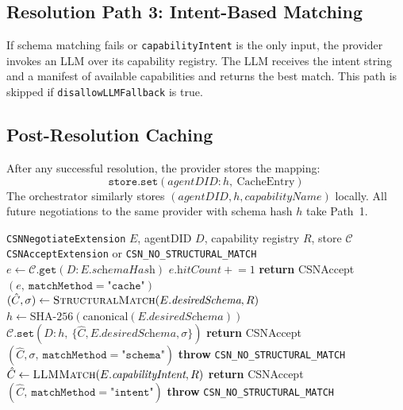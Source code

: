 \documentclass[conference]{IEEEtran}
\begin{document}
\subsection{Resolution Path 3: Intent-Based Matching}

If schema matching fails or \texttt{capabilityIntent} is the only
input, the provider invokes an LLM over its capability registry.
The LLM receives the intent string and a manifest of available
capabilities and returns the best match.  This path is skipped if
\texttt{disallowLLMFallback} is true.

\subsection{Post-Resolution Caching}

After any successful resolution, the provider stores the mapping:
\[
  \texttt{store.set}(\textit{agentDID}\!:\!h,\ \text{CacheEntry})
\]
The orchestrator similarly stores $(\textit{agentDID}, h,
\textit{capabilityName})$ locally.  All future negotiations to the
same provider with schema hash $h$ take Path~1.

\begin{algorithm}[t]
\caption{CSN Resolution (Provider-Side)}
\label{alg:csn}
{\small
\begin{algorithmic}[1]
\Require \texttt{CSNNegotiateExtension} $E$, agentDID $D$,
         capability registry $R$, store $\mathcal{C}$
\Ensure \texttt{CSNAcceptExtension} or \texttt{CSN\_NO\_STRUCTURAL\_MATCH}
  \State $e \gets \mathcal{C}.\texttt{get}(D\!:\!E.\textit{schemaHash})$
    \State $e.\textit{hitCount} \mathrel{+}= 1$
    \State \textbf{return} CSNAccept$(e,\ \texttt{matchMethod}=\texttt{"cache"})$
  \EndIf
\EndIf
{}
  \State $(\hat{C}, \sigma) \gets \textsc{StructuralMatch}(E.\textit{desiredSchema}, R)$
  \If{$\sigma \geq \theta$}
    \State $h \gets \text{SHA-256}(\text{canonical}(E.\textit{desiredSchema}))$
    \State $\mathcal{C}.\texttt{set}(D\!:\!h,\ \{\hat{C}, E.\textit{desiredSchema}, \sigma\})$
    \State \textbf{return} CSNAccept$(\hat{C}, \sigma,\ \texttt{matchMethod}=\texttt{"schema"})$
  \EndIf
\EndIf
{}
  \State \textbf{throw} \texttt{CSN\_NO\_STRUCTURAL\_MATCH}
\EndIf
{}
  \State $\hat{C} \gets \textsc{LLMMatch}(E.\textit{capabilityIntent}, R)$
    \State \textbf{return} CSNAccept$(\hat{C},\ \texttt{matchMethod}=\texttt{"intent"})$
  \EndIf
\EndIf
\State \textbf{throw} \texttt{CSN\_NO\_STRUCTURAL\_MATCH}
\end{algorithmic}
}
\end{algorithm}
\end{document}
